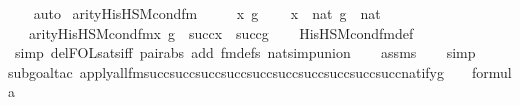 \begin{isabellebody}
\ \ \isamarkupfalse%
\ auto%
\endisatagproof
{\isafoldproof}%
%
\isadelimproof
\isanewline
%
\endisadelimproof
\isanewline
{}\isamarkupfalse%
\ arity{\isacharunderscore}{\kern0pt}His{\isacharunderscore}{\kern0pt}HS{\isacharunderscore}{\kern0pt}M{\isacharunderscore}{\kern0pt}cond{\isacharunderscore}{\kern0pt}fm\ {\isacharcolon}{\kern0pt}\ \isanewline
\ \ \ x{\isacharprime}{\kern0pt}\ g\ \isanewline
\ \ \ {\isachardoublequoteopen}x{\isacharprime}{\kern0pt}\ {\isasymin}\ nat{\isachardoublequoteclose}\ {\isachardoublequoteopen}g\ {\isasymin}\ nat{\isachardoublequoteclose}\ \isanewline
\ \ \ {\isachardoublequoteopen}arity{\isacharparenleft}{\kern0pt}His{\isacharunderscore}{\kern0pt}HS{\isacharunderscore}{\kern0pt}M{\isacharunderscore}{\kern0pt}cond{\isacharunderscore}{\kern0pt}fm{\isacharparenleft}{\kern0pt}x{\isacharprime}{\kern0pt}{\isacharcomma}{\kern0pt}\ g{\isacharparenright}{\kern0pt}{\isacharparenright}{\kern0pt}\ {\isasymle}\ succ{\isacharparenleft}{\kern0pt}x{\isacharprime}{\kern0pt}{\isacharparenright}{\kern0pt}\ {\isasymunion}\ succ{\isacharparenleft}{\kern0pt}g{\isacharparenright}{\kern0pt}{\isachardoublequoteclose}\isanewline
%
\isadelimproof
\isanewline
\ \ %
\endisadelimproof
%
\isatagproof
{}\isamarkupfalse%
\ His{\isacharunderscore}{\kern0pt}HS{\isacharunderscore}{\kern0pt}M{\isacharunderscore}{\kern0pt}cond{\isacharunderscore}{\kern0pt}fm{\isacharunderscore}{\kern0pt}def\ \isanewline
\ \ \isamarkupfalse%
\ {\isacharparenleft}{\kern0pt}simp\ del{\isacharcolon}{\kern0pt}FOL{\isacharunderscore}{\kern0pt}sats{\isacharunderscore}{\kern0pt}iff\ pair{\isacharunderscore}{\kern0pt}abs\ add{\isacharcolon}{\kern0pt}\ fm{\isacharunderscore}{\kern0pt}defs\ nat{\isacharunderscore}{\kern0pt}simp{\isacharunderscore}{\kern0pt}union{\isacharparenright}{\kern0pt}\isanewline
\ \ \isamarkupfalse%
\ assms\isanewline
\ \ \isamarkupfalse%
\ simp\isanewline
\ \ \isamarkupfalse%
{\isacharparenleft}{\kern0pt}subgoal{\isacharunderscore}{\kern0pt}tac\ {\isachardoublequoteopen}apply{\isacharunderscore}{\kern0pt}all{\isacharunderscore}{\kern0pt}{}{\isacharunderscore}{\kern0pt}fm{\isacharparenleft}{\kern0pt}succ{\isacharparenleft}{\kern0pt}succ{\isacharparenleft}{\kern0pt}succ{\isacharparenleft}{\kern0pt}succ{\isacharparenleft}{\kern0pt}succ{\isacharparenleft}{\kern0pt}succ{\isacharparenleft}{\kern0pt}succ{\isacharparenleft}{\kern0pt}succ{\isacharparenleft}{\kern0pt}succ{\isacharparenleft}{\kern0pt}succ{\isacharparenleft}{\kern0pt}natify{\isacharparenleft}{\kern0pt}g{\isacharparenright}{\kern0pt}{\isacharparenright}{\kern0pt}{\isacharparenright}{\kern0pt}{\isacharparenright}{\kern0pt}{\isacharparenright}{\kern0pt}{\isacharparenright}{\kern0pt}{\isacharparenright}{\kern0pt}{\isacharparenright}{\kern0pt}{\isacharparenright}{\kern0pt}{\isacharparenright}{\kern0pt}{\isacharparenright}{\kern0pt}{\isacharcomma}{\kern0pt}\ {}{\isacharcomma}{\kern0pt}\ {}{\isacharparenright}{\kern0pt}\ {\isasymin}\ formula{\isachardoublequoteclose}{\isacharparenright}{\kern0pt}\ \isanewline

\end{isabellebody}

